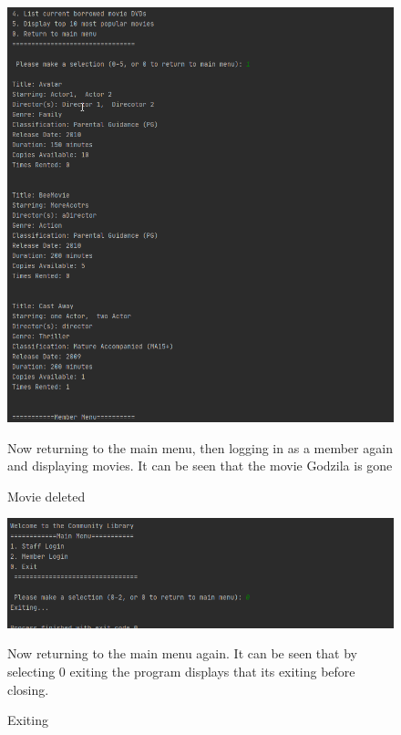 \documentclass[a4paper,12pt]{article}
\begin{document}
\begin{figure}[!htb]
\centering
\includegraphics[width=1\textwidth]{13}
\caption{Movie deleted}
\medskip
\small
Now returning to the main menu, then logging in as a member again and displaying movies. It can be seen that the movie Godzila is gone
\end{figure}


\begin{figure}[!htb]
\centering
\includegraphics[width=1\textwidth]{14}
\caption{Exiting}
\medskip
\small
Now returning to the main menu again. It can be seen that by selecting 0 exiting the program displays that its exiting before closing.
\end{figure}
\end{document}
